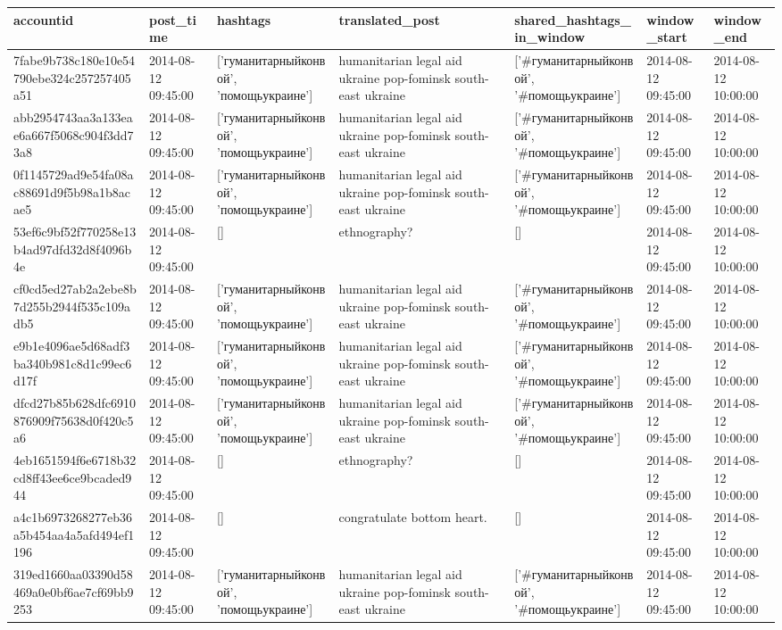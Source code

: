 \begin{tabular}{lllllll}
\toprule
accountid & post\_time & hashtags & translated\_post & shared\_hashtags\_in\_window & window\_start & window\_end \\
\midrule
7fabe9b738c180e10e54790ebe324c257257405a51 & 2014-08-12 09:45:00 & ['гуманитарныйконвой', 'помощьукраине'] & humanitarian legal aid ukraine pop-fominsk south-east ukraine & ['#гуманитарныйконвой', '#помощьукраине'] & 2014-08-12 09:45:00 & 2014-08-12 10:00:00 \\
abb2954743aa3a133eae6a667f5068c904f3dd73a8 & 2014-08-12 09:45:00 & ['гуманитарныйконвой', 'помощьукраине'] & humanitarian legal aid ukraine pop-fominsk south-east ukraine & ['#гуманитарныйконвой', '#помощьукраине'] & 2014-08-12 09:45:00 & 2014-08-12 10:00:00 \\
0f1145729ad9e54fa08ac88691d9f5b98a1b8acae5 & 2014-08-12 09:45:00 & ['гуманитарныйконвой', 'помощьукраине'] & humanitarian legal aid ukraine pop-fominsk south-east ukraine & ['#гуманитарныйконвой', '#помощьукраине'] & 2014-08-12 09:45:00 & 2014-08-12 10:00:00 \\
53ef6c9bf52f770258e13b4ad97dfd32d8f4096b4e & 2014-08-12 09:45:00 & [] & ethnography? & [] & 2014-08-12 09:45:00 & 2014-08-12 10:00:00 \\
cf0cd5ed27ab2a2ebe8b7d255b2944f535c109adb5 & 2014-08-12 09:45:00 & ['гуманитарныйконвой', 'помощьукраине'] & humanitarian legal aid ukraine pop-fominsk south-east ukraine & ['#гуманитарныйконвой', '#помощьукраине'] & 2014-08-12 09:45:00 & 2014-08-12 10:00:00 \\
e9b1e4096ae5d68adf3ba340b981c8d1c99ec6d17f & 2014-08-12 09:45:00 & ['гуманитарныйконвой', 'помощьукраине'] & humanitarian legal aid ukraine pop-fominsk south-east ukraine & ['#гуманитарныйконвой', '#помощьукраине'] & 2014-08-12 09:45:00 & 2014-08-12 10:00:00 \\
dfcd27b85b628dfc6910876909f75638d0f420c5a6 & 2014-08-12 09:45:00 & ['гуманитарныйконвой', 'помощьукраине'] & humanitarian legal aid ukraine pop-fominsk south-east ukraine & ['#гуманитарныйконвой', '#помощьукраине'] & 2014-08-12 09:45:00 & 2014-08-12 10:00:00 \\
4eb1651594f6e6718b32cd8ff43ee6ce9bcaded944 & 2014-08-12 09:45:00 & [] & ethnography? & [] & 2014-08-12 09:45:00 & 2014-08-12 10:00:00 \\
a4c1b6973268277eb36a5b454aa4a5afd494ef1196 & 2014-08-12 09:45:00 & [] & congratulate bottom heart. & [] & 2014-08-12 09:45:00 & 2014-08-12 10:00:00 \\
319ed1660aa03390d58469a0e0bf6ae7cf69bb9253 & 2014-08-12 09:45:00 & ['гуманитарныйконвой', 'помощьукраине'] & humanitarian legal aid ukraine pop-fominsk south-east ukraine & ['#гуманитарныйконвой', '#помощьукраине'] & 2014-08-12 09:45:00 & 2014-08-12 10:00:00 \\

\end{tabular}

